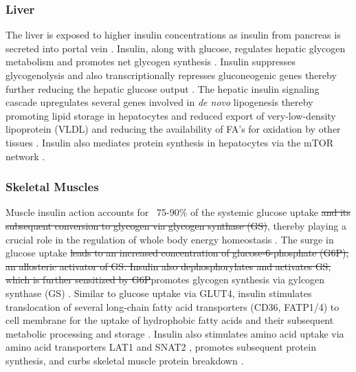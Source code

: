 \subsubsection{Liver}
The liver is exposed to higher insulin concentrations as insulin from pancreas is secreted into portal vein \textbf{\cite{petersen_mechanisms_2018}}. Insulin, along with glucose, regulates hepatic glycogen metabolism and promotes net glycogen synthesis \textbf{\cite{petersen_mechanisms_2018,rossetti_relative_1990,roden_roles_1996}}. Insulin suppresses glycogenolysis and also transcriptionally represses gluconeogenic genes thereby further reducing the hepatic glucose output \textbf{\cite{petersen_mechanisms_2018,claus_regulation_1976,cherrington_direct_1998,edgerton_insulins_2006}}. The hepatic insulin signaling cascade upregulates several genes involved in \textit{de novo} lipogenesis thereby promoting lipid storage in hepatocytes and reduced export of very-low-density lipoprotein (VLDL) \textbf{\cite{petersen_mechanisms_2018,leavens_insulin_2011}} and reducing the availability of FA’s for oxidation by other tissues \textbf{\cite{petersen_mechanisms_2018,dimitriadis_insulin_2011}}. Insulin also mediates protein synthesis in hepatocytes via the mTOR network \textbf{\cite{petersen_mechanisms_2018,ROS}}.

\subsubsection{Skeletal Muscles}
Muscle insulin action accounts for ~75-90\% of the systemic glucose uptake \st{and its subsequent conversion to glycogen via glycogen synthase (GS)}, thereby playing a crucial role in the regulation of whole body energy homeostasis \textbf{\cite{leto_regulation_2012,petersen_mechanisms_2018}}. The surge in glucose uptake \st{leads to an increased concentration of glucose-6-phosphate (G6P), an allosteric activator of GS. Insulin also dephosphorylates and activates GS, which is further sensitized by G6P}promotes glycogen synthesis via gylcogen synthase (GS) \textbf{\cite{sylow_many_2021}}. Similar to glucose uptake via GLUT4, insulin stimulates translocation of several long-chain fatty acid transporters (CD36, FATP1/4) to cell membrane for the uptake of hydrophobic fatty acids and their subsequent metabolic processing and storage \textbf{\cite{sylow_many_2021,luiken_insulin_2002,wu_fatp1_2006,abumrad_membrane_1999}}. Insulin also stimulates amino acid uptake via amino acid transporters LAT1 and SNAT2 \textbf{\cite{sylow_many_2021,drummond_increase_2010}}, promotes subsequent protein synthesis, and curbs skeletal muscle protein breakdown \textbf{\cite{dimitriadis_insulin_2011,sylow_many_2021}}.

